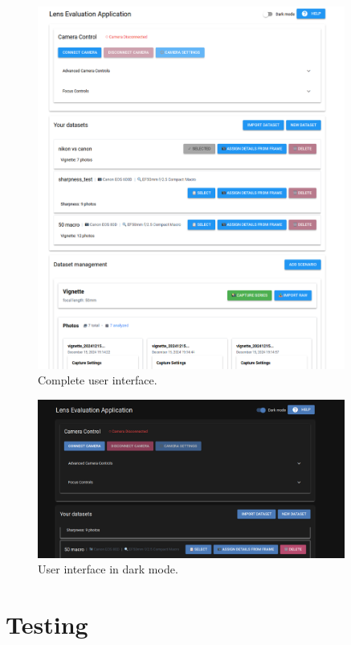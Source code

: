 \begin{figure}[h]
\centering
\includegraphics[width=0.9\textwidth]{Images/screen2.png}
\caption{Complete user interface.}
\label{fig:ui_notification}
\end{figure}

\begin{figure}[h]
\centering
\includegraphics[width=0.9\textwidth]{Images/screen3.png}
\caption{User interface in dark mode.}
\label{fig:ui_notification}
\end{figure}


\section{Testing}

